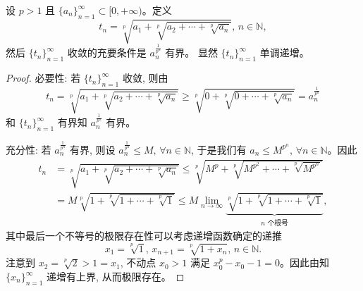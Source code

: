 \documentclass[../../main.tex]{subfiles}
\begin{document}
\begin{theorem}[Herschfeld判别法]\label{theorem:Herschfeld判别法}
设 \( p > 1 \) 且 \( \{a_n\}_{n = 1}^{\infty} \subset [0, +\infty) \)。定义
\[
t_n = \sqrt[p]{a_1 + \sqrt[p]{a_2 + \cdots + \sqrt[p]{a_n}}}, \, n \in \mathbb{N},
\]
然后 \( \{t_n\}_{n = 1}^{\infty} \) 收敛的充要条件是 \( a_n^{\frac{1}{p^n}} \) 有界。
显然 \( \{t_n\}_{n = 1}^{\infty} \) 单调递增。
\end{theorem}
\begin{proof}
{\heiti 必要性:} 若 \( \{t_n\}_{n = 1}^{\infty} \) 收敛, 则由
\[
t_n = \sqrt[p]{a_1 + \sqrt[p]{a_2 + \cdots + \sqrt[p]{a_n}}} \geqslant \sqrt[p]{0 + \sqrt[p]{0 + \cdots + \sqrt[p]{a_n}}} = a_n^{\frac{1}{p^n}}
\]
和 \( \{t_n\}_{n = 1}^{\infty} \) 有界知 \( a_n^{\frac{1}{p^n}} \) 有界。

{\heiti 充分性:} 若 \( a_n^{\frac{1}{p^n}} \) 有界, 则设 \( a_n^{\frac{1}{p^n}} \leqslant M, \, \forall n \in \mathbb{N} \), 于是我们有 \( a_n \leqslant M^{p^n}, \, \forall n \in \mathbb{N} \)。因此
\begin{align*}
t_n &= \sqrt[p]{a_1 + \sqrt[p]{a_2 + \cdots + \sqrt[p]{a_n}}} \leqslant \sqrt[p]{M^{p} + \sqrt[p]{M^{p^2} + \cdots + \sqrt[p]{M^{p^n}}}} \\
&= M\sqrt[p]{1 + \sqrt[p]{1 + \cdots + \sqrt[p]{1}}} \leqslant M \lim_{n \to \infty} \underbrace{\sqrt[p]{1 + \sqrt[p]{1 + \cdots + \sqrt[p]{1}}}}_{n \text{ 个根号}},
\end{align*}
其中最后一个不等号的极限存在性可以考虑递增函数确定的递推
\[
x_1 = \sqrt[p]{1}, \, x_{n + 1} = \sqrt[p]{1 + x_n}, \, n \in \mathbb{N}.
\]
注意到 \( x_2 = \sqrt[p]{2} > 1 = x_1 \), 不动点 \( x_0 > 1 \) 满足 \( x_0^p - x_0 - 1 = 0 \)。因此由知 \( \{x_n\}_{n = 1}^{\infty} \) 递增有上界, 从而极限存在。

\end{proof}
\end{document}
